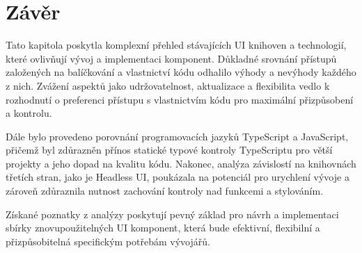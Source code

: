 \section{Závěr}
Tato kapitola poskytla komplexní přehled stávajících UI knihoven a technologií, které ovlivňují vývoj a implementaci komponent. Důkladné srovnání přístupů založených na balíčkování a vlastnictví kódu odhalilo výhody a nevýhody každého z nich. Zvážení aspektů jako udržovatelnost, aktualizace a flexibilita vedlo k rozhodnutí o preferenci přístupu s vlastnictvím kódu pro maximální přizpůsobení a kontrolu.

Dále bylo provedeno porovnání programovacích jazyků TypeScript a JavaScript, přičemž byl zdůrazněn přínos statické typové kontroly TypeScriptu pro větší projekty a jeho dopad na kvalitu kódu. Nakonec, analýza závislostí na knihovnách třetích stran, jako je Headless UI, poukázala na potenciál pro urychlení vývoje a zároveň zdůraznila nutnost zachování kontroly nad funkcemi a stylováním.

Získané poznatky z analýzy poskytují pevný základ pro návrh a implementaci sbírky znovupoužitelných UI komponent, která bude efektivní, flexibilní a přizpůsobitelná specifickým potřebám vývojářů.

